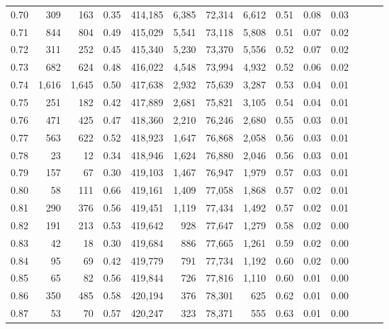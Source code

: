 \begin{tabular}{rrrrrrrrrrrrrr}
0.70 &     309 &    163 &  0.35 &  414,185 &    6,385 &  72,314 &   6,612 &  0.51 &  0.08 &      0.03 \\
0.71 &     844 &    804 &  0.49 &  415,029 &    5,541 &  73,118 &   5,808 &  0.51 &  0.07 &      0.02 \\
0.72 &     311 &    252 &  0.45 &  415,340 &    5,230 &  73,370 &   5,556 &  0.52 &  0.07 &      0.02 \\
0.73 &     682 &    624 &  0.48 &  416,022 &    4,548 &  73,994 &   4,932 &  0.52 &  0.06 &      0.02 \\
0.74 &   1,616 &  1,645 &  0.50 &  417,638 &    2,932 &  75,639 &   3,287 &  0.53 &  0.04 &      0.01 \\
0.75 &     251 &    182 &  0.42 &  417,889 &    2,681 &  75,821 &   3,105 &  0.54 &  0.04 &      0.01 \\
0.76 &     471 &    425 &  0.47 &  418,360 &    2,210 &  76,246 &   2,680 &  0.55 &  0.03 &      0.01 \\
0.77 &     563 &    622 &  0.52 &  418,923 &    1,647 &  76,868 &   2,058 &  0.56 &  0.03 &      0.01 \\
0.78 &      23 &     12 &  0.34 &  418,946 &    1,624 &  76,880 &   2,046 &  0.56 &  0.03 &      0.01 \\
0.79 &     157 &     67 &  0.30 &  419,103 &    1,467 &  76,947 &   1,979 &  0.57 &  0.03 &      0.01 \\
0.80 &      58 &    111 &  0.66 &  419,161 &    1,409 &  77,058 &   1,868 &  0.57 &  0.02 &      0.01 \\
0.81 &     290 &    376 &  0.56 &  419,451 &    1,119 &  77,434 &   1,492 &  0.57 &  0.02 &      0.01 \\
0.82 &     191 &    213 &  0.53 &  419,642 &      928 &  77,647 &   1,279 &  0.58 &  0.02 &      0.00 \\
0.83 &      42 &     18 &  0.30 &  419,684 &      886 &  77,665 &   1,261 &  0.59 &  0.02 &      0.00 \\
0.84 &      95 &     69 &  0.42 &  419,779 &      791 &  77,734 &   1,192 &  0.60 &  0.02 &      0.00 \\
0.85 &      65 &     82 &  0.56 &  419,844 &      726 &  77,816 &   1,110 &  0.60 &  0.01 &      0.00 \\
0.86 &     350 &    485 &  0.58 &  420,194 &      376 &  78,301 &     625 &  0.62 &  0.01 &      0.00 \\
0.87 &      53 &     70 &  0.57 &  420,247 &      323 &  78,371 &     555 &  0.63 &  0.01 &      0.00 \\

\end{tabular}
